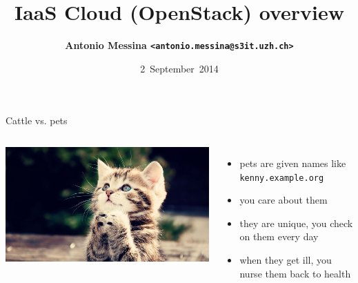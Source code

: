 \documentclass[english,serif,mathserif,usenames,dvipsnames]{beamer}
\begin{document}
\title[IaaS (OpenStack) overview]{IaaS Cloud (OpenStack) overview}

\author{%
  {\bfseries Antonio Messina \texttt{<antonio.messina@s3it.uzh.ch>}}  
}

\date{2~September~2014}

\maketitle

\begin{frame}[fragile]
  {Cattle vs. pets}

  \scriptsize
  \begin{columns}
    \includegraphics[width=\linewidth]{kitten}
      \begin{itemize}
      \item pets are given names like \texttt{kenny.example.org}
      \item you care about them
      \item they are unique, you check on them every day
      \item when they get ill, you nurse them back to health
      \end{itemize}

  \end{columns}
  \+\+\+
  \begin{columns}


\end{columns}
\end{frame}
\end{document}
